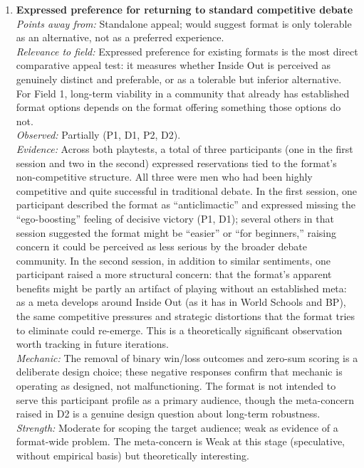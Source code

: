 \begin{enumerate}
\item \textbf{Expressed preference for returning to standard competitive debate}\\
\textit{Points away from:} Standalone appeal; would suggest format is only tolerable as an alternative, not as a preferred experience.\\
\textit{Relevance to field:} Expressed preference for existing formats is the most direct comparative appeal test: it measures whether Inside Out is perceived as genuinely distinct and preferable, or as a tolerable but inferior alternative. For Field 1, long-term viability in a community that already has established format options depends on the format offering something those options do not.\\
\textit{Observed:} Partially (P1, D1, P2, D2).\\
\textit{Evidence:} Across both playtests, a total of three participants (one in the first session and two in the second) expressed reservations tied to the format's non-competitive structure. All three were men who had been highly competitive and quite successful in traditional debate. In the first session, one participant described the format as ``anticlimactic'' and expressed missing the ``ego-boosting'' feeling of decisive victory (P1, D1); several others in that session suggested the format might be ``easier'' or ``for beginners,'' raising concern it could be perceived as less serious by the broader debate community. In the second session, in addition to similar sentiments, one participant raised a more structural concern: that the format's apparent benefits might be partly an artifact of playing without an established meta: as a meta develops around Inside Out (as it has in World Schools and BP), the same competitive pressures and strategic distortions that the format tries to eliminate could re-emerge. This is a theoretically significant observation worth tracking in future iterations.\\
\textit{Mechanic:} The removal of binary win/loss outcomes and zero-sum scoring is a deliberate design choice; these negative responses confirm that mechanic is operating as designed, not malfunctioning. The format is not intended to serve this participant profile as a primary audience, though the meta-concern raised in D2 is a genuine design question about long-term robustness.\\
\textit{Strength:} Moderate for scoping the target audience; weak as evidence of a format-wide problem. The meta-concern is Weak at this stage (speculative, without empirical basis) but theoretically interesting.


\end{enumerate}
